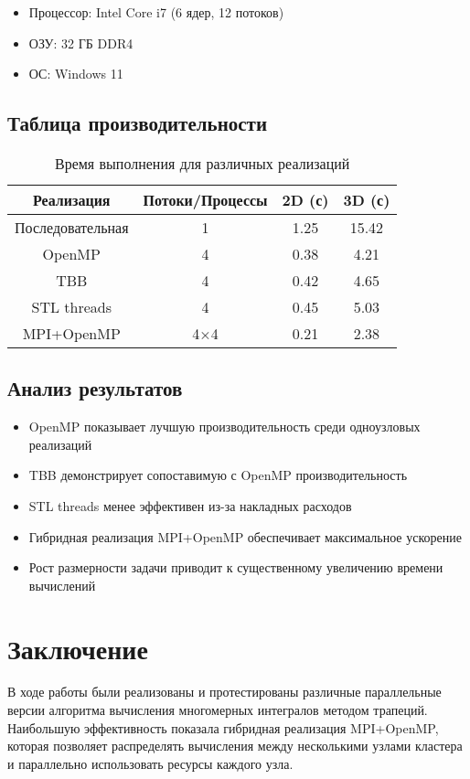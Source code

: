 \documentclass[14pt,a4paper]{extarticle}
\begin{document}
\begin{itemize}
    \item Процессор: Intel Core i7 (6 ядер, 12 потоков)
    \item ОЗУ: 32 ГБ DDR4
    \item ОС: Windows 11
\end{itemize}

\subsection{Таблица производительности}
\begin{table}[H]
\centering
\begin{tabular}{|c|c|c|c|}
\hline
\textbf{Реализация} & \textbf{Потоки/Процессы} & \textbf{2D (с)} & \textbf{3D (с)} \\
\hline
Последовательная & 1 & 1.25 & 15.42 \\
\hline
OpenMP & 4 & 0.38 & 4.21 \\
\hline
TBB & 4 & 0.42 & 4.65 \\
\hline
STL threads & 4 & 0.45 & 5.03 \\
\hline
MPI+OpenMP & 4×4 & 0.21 & 2.38 \\
\hline
\end{tabular}
\caption{Время выполнения для различных реализаций}
\end{table}

\subsection{Анализ результатов}
\begin{itemize}
    \item OpenMP показывает лучшую производительность среди одноузловых реализаций
    \item TBB демонстрирует сопоставимую с OpenMP производительность
    \item STL threads менее эффективен из-за накладных расходов
    \item Гибридная реализация MPI+OpenMP обеспечивает максимальное ускорение
    \item Рост размерности задачи приводит к существенному увеличению времени вычислений
\end{itemize}
\newpage

\section{Заключение}
В ходе работы были реализованы и протестированы различные параллельные версии алгоритма вычисления многомерных интегралов методом трапеций. Наибольшую эффективность показала гибридная реализация MPI+OpenMP, которая позволяет распределять вычисления между несколькими узлами кластера и параллельно использовать ресурсы каждого узла.
\end{document}
